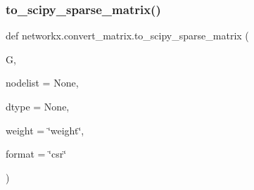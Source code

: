 \subsubsection{\texorpdfstring{to\+\_\+scipy\+\_\+sparse\+\_\+matrix()}{to\_scipy\_sparse\_matrix()}}
{\footnotesize\ttfamily def networkx.\+convert\+\_\+matrix.\+to\+\_\+scipy\+\_\+sparse\+\_\+matrix (\begin{DoxyParamCaption}\item[{}]{G,  }\item[{}]{nodelist = {\ttfamily None},  }\item[{}]{dtype = {\ttfamily None},  }\item[{}]{weight = {\ttfamily \char`\"{}weight\char`\"{}},  }\item[{}]{format = {\ttfamily \char`\"{}csr\char`\"{}} }\end{DoxyParamCaption})}

